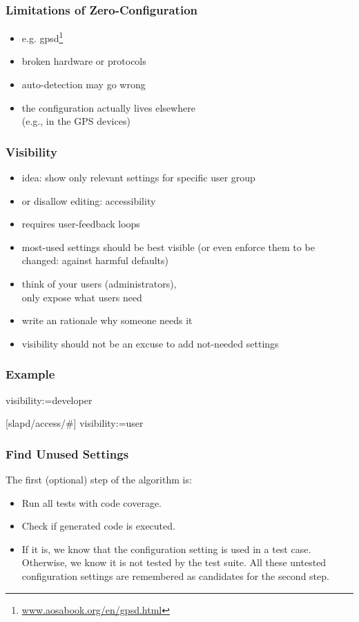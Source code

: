 \begin{frame}
	\frametitle{Limitations of Zero-Configuration}
	\begin{itemize}
	\item e.g. gpsd\footnote{\url{www.aosabook.org/en/gpsd.html}}
	\pause
	\item broken hardware or protocols
	\item auto-detection may go wrong
	\item the configuration actually lives elsewhere \\ (e.g., in the GPS devices)
	\end{itemize}
\end{frame}

\begin{frame}
	\frametitle{Visibility}
	\begin{itemize}
	\item idea: show only relevant settings for specific user group
	\item or disallow editing: accessibility
	\pause
	\item requires user-feedback loops~\cite{xu2015hey}
	\item most-used settings should be best visible (or even enforce them to be changed: against harmful defaults)
	\item think of your users (administrators), \\ only expose what users need
	\item write an rationale why someone needs it
	\pause
	\item visibility should not be an excuse to add not-needed settings
	\end{itemize}
\end{frame}

\begin{frame}[fragile]
	\frametitle{Example}
	\begin{code}
	visibility:=developer

	[slapd/access/#]
	visibility:=user
	\end{code}
\end{frame}


\begin{frame}
	\frametitle{Find Unused Settings}

	The first (optional) step of the algorithm is:
	\begin{itemize}
	\item Run all tests with code coverage.
	\item Check if generated code is executed.
	\item If it is, we know that the configuration setting is used in a test case.
	Otherwise, we know it is not tested by the test suite.
	All these untested configuration settings are remembered as candidates for the second step.
	\end{itemize}
\end{frame}


